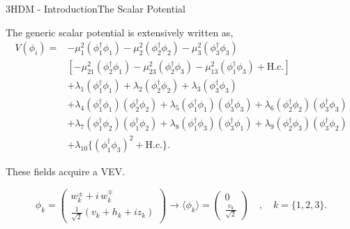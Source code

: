 \documentclass[10pt,xcolor=dvipsnames,mathserif]{beamer}
\begin{document}
\begin{frame}{3HDM - Introduction}{The Scalar Potential}

The generic scalar potential is extensively written as, 
\begin{equation*}
\label{eq:3HDM_Scalar_Pot}
\begin{split}
V(\phi_i) = & 
- \mu_1^2 \left( \phi^{\dagger}_1 \phi_1 \right) 
- \mu_2^2 \left( \phi^{\dagger}_2 \phi_2 \right)  
- \mu_3^2 \left( \phi^{\dagger}_3 \phi_3 \right) \\ 
& \left[ - \mu_{21}^2 \left( \phi^{\dagger}_2 \phi_1  \right) 
- \mu_{23}^2 \left( \phi^{\dagger}_2 \phi_3  \right)  
- \mu_{13}^2 \left( \phi^{\dagger}_1 \phi_3  \right) + \text{H.c.} \right]  \\
& + \lambda_1 \left( \phi^{\dagger}_1 \phi_1 \right) 
+ \lambda_2 \left( \phi^{\dagger}_2 \phi_2 \right)  
+ \lambda_3 \left( \phi^{\dagger}_3 \phi_3 \right) \\  
& + \lambda_4 \left( \phi^{\dagger}_1 \phi_1 \right)  \left( \phi^{\dagger}_2 \phi_2 \right) 
+ \lambda_5 \left( \phi^{\dagger}_1 \phi_1 \right)  \left( \phi^{\dagger}_3 \phi_3 \right)  
+ \lambda_6 \left( \phi^{\dagger}_2 \phi_2 \right)  \left( \phi^{\dagger}_3 \phi_3 \right)  \\ 
& + \lambda_7 \left( \phi^{\dagger}_1 \phi_2 \right)  \left( \phi^{\dagger}_1 \phi_2 \right)  
+ \lambda_8 \left( \phi^{\dagger}_1 \phi_3 \right)  \left( \phi^{\dagger}_3 \phi_1 \right)   
+ \lambda_9 \left( \phi^{\dagger}_2 \phi_3 \right)  \left( \phi^{\dagger}_3 \phi_2 \right)  \\
& + \lambda_{10} \Bigg\{ \left( \phi^{\dagger}_1 \phi_3 \right)^2 + \text{H.c.} \Bigg\} . 
\end{split} 
\end{equation*}

These fields acquire a VEV. 

\begin{equation*}
\phi_k = 
\begin{pmatrix}
w_k^\pm + i \, w_k^\mp \\ 
\frac{1}{\sqrt{2}}\left( v_k + h_k + i z_k \right)
\end{pmatrix}  \rightarrow \langle \phi_k \rangle = \begin{pmatrix}
0 \\ 
\frac{v_k}{\sqrt{2}}
\end{pmatrix} \quad , \quad k=\{ 1,2,3\} .  
\label{eq:3HDM_Higgs_Field_VEV} 
\end{equation*} 

\end{frame}
\end{document}
